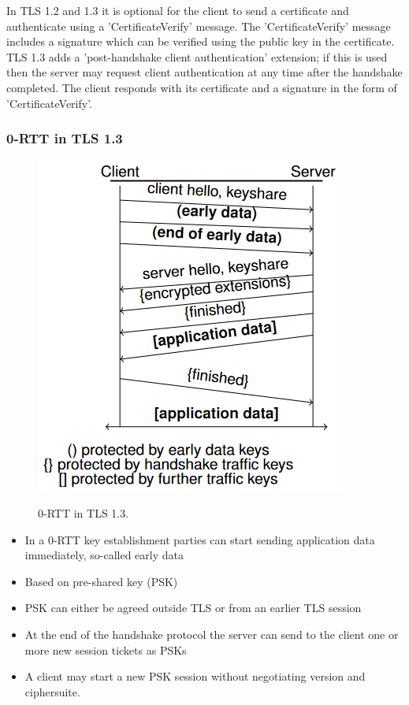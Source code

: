 \documentclass{article}
\begin{document}
In TLS 1.2 and 1.3 it is optional for the client to send a certificate and authenticate using a 'CertificateVerify' message. The 'CertificateVerify' message includes a signature which can be verified using the public key in the certificate.\\
TLS 1.3 adds a 'post-handshake client authentication' extension; if this is used then the server may request client authentication at any time after the handshake completed. The client responds with its certificate and a signature in the form of 'CertificateVerify'.

\subsubsection{0-RTT in TLS 1.3}

\noindent\begin{minipage}{0.48\textwidth}%
\begin{figure}[H]
\begin{center}
\includegraphics[scale=0.58]{Images/0rtttls13.png}
\label{fig:fround}
\caption{0-RTT in TLS 1.3.}
\end{center}
\end{figure}
\end{minipage}%
\hfill%
\begin{minipage}{0.48\textwidth}
\begin{itemize}
    \item In a 0-RTT key establishment parties can start sending application data immediately, so-called early data
    \item Based on pre-shared key (PSK)
    \item PSK can either be agreed outside TLS or from an earlier TLS session
    \item At the end of the handshake protocol the server can send to the client one or more new session tickets as PSKs
    \item A client may start a new PSK session without negotiating version and ciphersuite.
\end{itemize}
\end{minipage}
\end{document}
